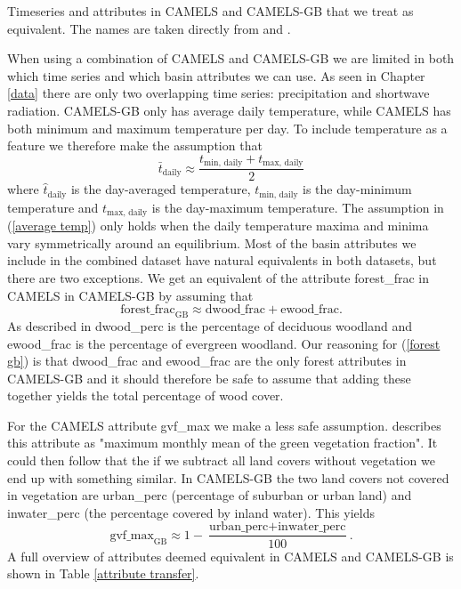 \begin{table}
    \centering
        \caption[Common attributes and timeseries CAMELS and CAMELS-GB.]{Timeseries and attributes in CAMELS and CAMELS-GB that we treat as 
    equivalent. The names are taken directly from \citet{CAMELS_US} and \citet{CAMELS_GB}.}
    
    \label{attribute transfer}
\end{table}
When using a combination of CAMELS and CAMELS-GB we are limited in both which 
time series and which basin attributes we can use.
As seen in Chapter \ref{data} there are only two overlapping time series: precipitation 
and shortwave radiation. CAMELS-GB only has 
average daily temperature, while CAMELS has both minimum and maximum temperature 
per day. To include temperature as a feature we therefore make the assumption that 
\begin{equation}
    \bar{t}_\text{daily} \approx \frac{t_\text{min, daily} + t_\text{max, daily}}{2} \label{average temp}
\end{equation}
where $\hat{t}_\text{daily}$ is the day-averaged temperature, $t_\text{min, daily}$ is 
the day-minimum temperature and $t_\text{max, daily}$ is the day-maximum temperature.
The assumption in (\ref{average temp}) only holds when the daily temperature maxima 
and minima vary symmetrically around an equilibrium.
Most of the basin attributes we include in the combined dataset have natural equivalents 
in both datasets, but there are two exceptions. We get an equivalent of the attribute 
forest\_frac in CAMELS in CAMELS-GB by assuming that
\begin{equation}
    \text{forest\_frac}_\text{GB} \approx \text{dwood\_frac} + \text{ewood\_frac}. \label{forest gb}
\end{equation}
As described in \citet{CAMELS_GB} dwood\_perc is the percentage of deciduous woodland 
and ewood\_frac is the percentage of evergreen woodland.
Our reasoning for (\ref{forest gb}) is that dwood\_frac and ewood\_frac are the only 
forest attributes in CAMELS-GB and it should therefore be safe to assume that adding 
these together yields the total percentage of wood cover.

For the CAMELS attribute gvf\_max we make a less safe assumption. \citet{CAMELS_US} 
describes this attribute as "maximum monthly mean of the green vegetation fraction". 
It could then follow that the if we subtract all land covers without vegetation 
we end up with something similar. In CAMELS-GB the two land covers not covered in 
vegetation are urban\_perc (percentage of suburban or urban land) and inwater\_perc 
(the percentage covered by inland water). This yields
\begin{equation}
    \text{gvf\_max}_\text{GB} \approx 1 - \frac{\text{urban\_perc} + \text{inwater\_perc}}{100}. \label{gvf gb}
\end{equation}
A full overview of attributes deemed equivalent in CAMELS and CAMELS-GB is shown in 
Table \ref{attribute transfer}.

